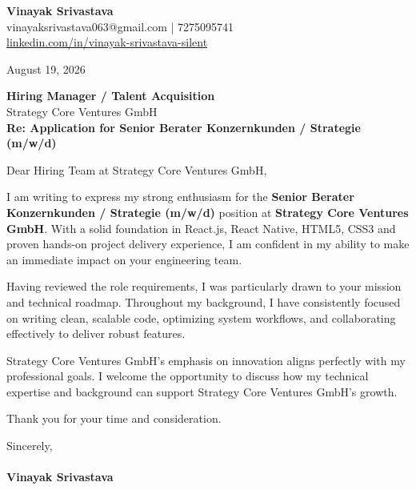 \documentclass[11pt,a4paper]{article}
\begin{document}
\thispagestyle{empty}

{\Large \textbf{Vinayak Srivastava}}\\
vinayaksrivastava063@gmail.com | 7275095741 \\
\url{linkedin.com/in/vinayak-srivastava-silent}

\vspace{1em}
\hfill August 19, 2026

\textbf{Hiring Manager / Talent Acquisition}\\
Strategy Core Ventures GmbH\\

\vspace{1.5em}
\textbf{Re: Application for Senior Berater Konzernkunden / Strategie (m/w/d)}

\vspace{1em}
Dear Hiring Team at Strategy Core Ventures GmbH,

I am writing to express my strong enthusiasm for the \textbf{Senior Berater Konzernkunden / Strategie (m/w/d)} position at \textbf{Strategy Core Ventures GmbH}. With a solid foundation in React.js, React Native, HTML5, CSS3 and proven hands-on project delivery experience, I am confident in my ability to make an immediate impact on your engineering team.

Having reviewed the role requirements, I was particularly drawn to your mission and technical roadmap. Throughout my background, I have consistently focused on writing clean, scalable code, optimizing system workflows, and collaborating effectively to deliver robust features.

Strategy Core Ventures GmbH's emphasis on innovation aligns perfectly with my professional goals. I welcome the opportunity to discuss how my technical expertise and background can support Strategy Core Ventures GmbH's growth.

Thank you for your time and consideration.

\vspace{1.5em}
Sincerely,\\
\vspace{1em}\\
\textbf{Vinayak Srivastava}
\end{document}
